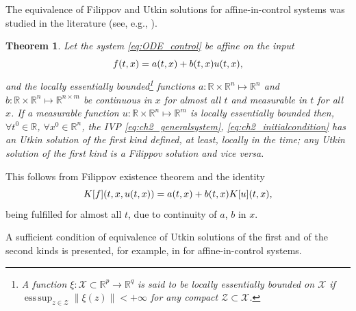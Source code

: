 \documentclass{article}
\newcommand{\R}{\mathbb{R}}
\newtheorem{theorem}{Theorem}
\DeclareMathOperator*{\esssup}{ess\,sup}
\begin{document}
The equivalence of Filippov and Utkin solutions for affine-in-control systems was studied in the literature (see, e.g.,  \cite{Utkin1992:Book}).
\begin{theorem}\label{thm:UtkinZolezzi}\itshape
	Let  the system \eqref{eq:ODE_control} be affine on the input \vspace{-1mm}
	$$
	f(t,x)=a(t,x)+b(t,x)u(t,x),\vspace{-1mm}
	$$
	and  the locally essentially bounded\footnote{ A function $\xi : \mathcal{X}\subset \R^p\to \R^q$ is said to be locally essentially bounded  on $\mathcal{X}$ if $\esssup_{z\in\mathcal{Z}} \|\xi(z)\|<+\infty$ for any compact  $\mathcal{Z}\subset \mathcal{X}$.} functions 
	$a: \R\times \R^n \mapsto  \R^n$ and 
	$b: \R\times \R^n \mapsto  \R^{n\times m}$ be continuous in $x$ for almost all $t$ and measurable in $t$ for all $x$.
	If a measurable function $u:\R\times \R^{n}\mapsto \R^{m}$ is locally essentially bounded 
	then,  
 $\forall  t^0\in \R$, $\forall x^0\in \R^n$, the IVP \eqref{eq:ch2_generalsystem}, \eqref{eq:ch2_initialcondition}  has an Utkin  solution of the first kind defined, at least, locally in the time; any Utkin solution of the first kind is a Filippov solution and vice versa.
\end{theorem}
This follows from Filippov existence theorem and the identity\vspace{-1mm}
\[
K[f](t,x,u(t,x))=a(t,x)+b(t,x)K[u](t,x),\vspace{-1mm}
\]
being fulfilled for almost all $t$, due to  continuity of $a$, $b$ in $x$.

A sufficient condition of equivalence of Utkin solutions of the first  and of the second kinds is presented, for example, in \cite[Theorem 14, page 44]{Zolezzi2002:inBook} for affine-in-control systems.
\end{document}
